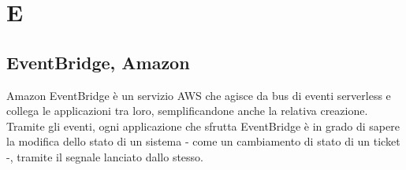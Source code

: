 \section{E}
\subsection{EventBridge, Amazon}
Amazon EventBridge è un servizio AWS che agisce da bus di eventi serverless e collega le applicazioni tra loro, semplificandone anche la relativa creazione. Tramite gli eventi, ogni applicazione che sfrutta EventBridge è in grado di sapere la modifica dello stato di un sistema - come un cambiamento di stato di un ticket -, tramite il segnale lanciato dallo stesso. 
\clearpage